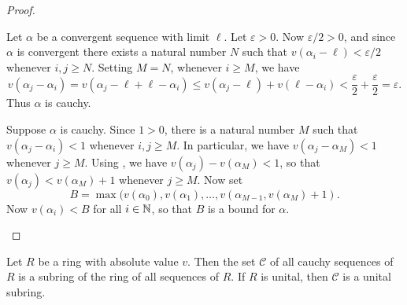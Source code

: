 \begin{proof}
\begin{inlineproplist}
\item Let \(\alpha\) be a convergent sequence with limit \(\ell\). Let \(\varepsilon > 0\). Now \(\varepsilon/2 > 0\), and since \(\alpha\) is convergent there exists a natural number \(N\) such that \(v(\alpha_i - \ell) < \varepsilon/2\) whenever \(i,j \geq N\). Setting \(M = N\), whenever \(i \geq M\), we have \[ v(\alpha_j - \alpha_i) = v(\alpha_j - \ell + \ell - \alpha_i) \leq v(\alpha_j - \ell) + v(\ell - \alpha_i) < \frac{\varepsilon}{2} + \frac{\varepsilon}{2} = \varepsilon. \] Thus \(\alpha\) is cauchy.
\item Suppose \(\alpha\) is cauchy. Since \(1 > 0\), there is a natural number \(M\) such that \(v(\alpha_j - \alpha_i) < 1\) whenever \(i,j \geq M\). In particular, we have \(v(\alpha_j - \alpha_M) < 1\) whenever \(j \geq M\). Using , we have \(v(\alpha_j) - v(\alpha_M) < 1\), so that \(v(\alpha_j) < v(\alpha_M) + 1\) whenever \(j \geq M\). Now set \[ B = \max(v(\alpha_0), v(\alpha_1), \ldots, v(\alpha_{M-1}, v(\alpha_M) + 1). \] Now \(v(\alpha_i) < B\) for all \(i \in \mathbb{N}\), so that \(B\) is a bound for \(\alpha\).
\end{inlineproplist}
\end{proof}

\begin{prop}
Let \(R\) be a ring with absolute value \(v\). Then the set \(\mathcal{C}\) of all cauchy sequences of \(R\) is a subring of the ring of all sequences of \(R\). If \(R\) is unital, then \(\mathcal{C}\) is a unital subring.
\end{prop}

